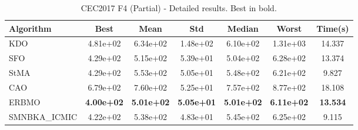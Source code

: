 \begin{table}[H]
\centering\small
\caption{CEC2017 F4 (Partial) - Detailed results. Best in bold.}
\label{tab:cec2017_F4}
\begin{tabular}{lcccccc}
\toprule
\textbf{Algorithm} & \textbf{Best} & \textbf{Mean} & \textbf{Std} & \textbf{Median} & \textbf{Worst} & \textbf{Time(s)} \\
\midrule
KDO & 4.81e+02 & 6.34e+02 & 1.48e+02 & 6.10e+02 & 1.31e+03 & 14.337 \\
SFO & 4.29e+02 & 5.15e+02 & 5.39e+01 & 5.04e+02 & 6.28e+02 & 13.374 \\
StMA & 4.29e+02 & 5.53e+02 & 5.05e+01 & 5.48e+02 & 6.21e+02 & 9.827 \\
CAO & 6.79e+02 & 7.60e+02 & 5.25e+01 & 7.57e+02 & 8.77e+02 & 18.108 \\
ERBMO & \textbf{4.00e+02} & \textbf{5.01e+02} & \textbf{5.05e+01} & \textbf{5.01e+02} & \textbf{6.11e+02} & \textbf{13.534} \\
SMNBKA_ICMIC & 4.22e+02 & 5.38e+02 & 4.83e+01 & 5.45e+02 & 6.25e+02 & 9.115 \\
\bottomrule
\end{tabular}
\end{table}
